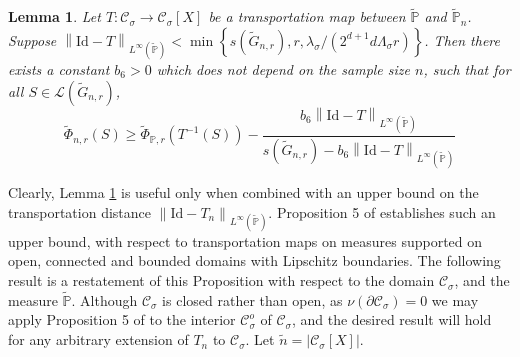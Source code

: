 \documentclass[11pt,twoside]{article}
\newtheorem{lemma}{Lemma}
\theoremstyle{definition}
\newcommand{\set}[1]{\left\{#1\right\}}
\newcommand{\abs}[1]{\left \lvert #1 \right \rvert}
\newcommand{\norm}[1]{\left\lVert#1\right\rVert}
\newcommand{\1}{\mathbbm{1}}
\newcommand{\Xbf}{X}
\newcommand{\Pbb}{\mathbb{P}}
\newcommand{\Cset}{\mathcal{C}}
\newcommand{\Csig}{\Cset_{\sigma}}
\begin{document}
\begin{lemma}
	\label{lem: graph_to_continuous_conductance}
	Let $T:\Csig \to \Csig[\Xbf]$ be a transportation map between $\widetilde{\Pbb}$ and $\widetilde{\Pbb}_n$. Suppose $\norm{\mathrm{Id} - T}_{L^{\infty}(\widetilde{\Pbb})} < \min \set{s(\widetilde{G}_{n,r}),r, \lambda_{\sigma}/(2^{d+1}d\Lambda_{\sigma}r)}$. Then there exists a constant $b_6 > 0$ which does not depend on the sample size $n$, such that for all $S \in \mathcal{L}(\widetilde{G}_{n,r})$, 
	\begin{equation}
	\label{eqn: graph_to_continuous_conductance}
	\widetilde{\Phi}_{n,r}(S) \geq \widetilde{\Phi}_{\Pbb,r}(T^{-1}(S)) - \frac{b_6\norm{\mathrm{Id} - T}_{L^{\infty}(\widetilde{\Pbb})} }{s(\widetilde{G}_{n,r}) - b_6 \norm{\mathrm{Id} - T}_{L^{\infty}(\widetilde{\Pbb})}  }
	\end{equation}
\end{lemma}

Clearly, Lemma \ref{lem: graph_to_continuous_conductance} is useful only when combined with an upper bound on the transportation distance $\norm{\mathrm{Id} - T_n}_{L^{\infty}(\widetilde{\Pbb})}$. Proposition 5 of \cite{garciatrillos16} establishes such an upper bound, with respect to transportation maps on measures supported on open, connected and bounded domains with Lipschitz boundaries. The following result is a restatement of this Proposition with respect to the domain $\Csig$, and the measure $\widetilde{\Pbb}$. Although $\Csig$ is closed rather than open, as $\nu(\partial \Csig) = 0$ we may apply Proposition 5 of \cite{garciatrillos16} to the interior $\Csig^o$ of $\Csig$, and the desired result will hold for any arbitrary extension of $T_n$ to $\Csig$. Let $\widetilde{n} = \abs{\Csig[\Xbf]}$. 
\end{document}

